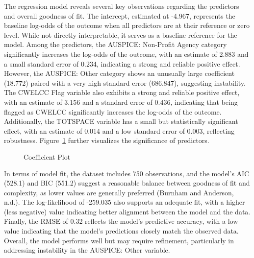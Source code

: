 \documentclass[
  letterpaper,
  DIV=11,
  numbers=noendperiod]{scrartcl}
\begin{document}
The regression model reveals several key observations regarding the
predictors and overall goodness of fit. The intercept, estimated at
-4.967, represents the baseline log-odds of the outcome when all
predictors are at their reference or zero level. While not directly
interpretable, it serves as a baseline reference for the model. Among
the predictors, the AUSPICE: Non-Profit Agency category significantly
increases the log-odds of the outcome, with an estimate of 2.883 and a
small standard error of 0.234, indicating a strong and reliable positive
effect. However, the AUSPICE: Other category shows an unusually large
coefficient (18.772) paired with a very high standard error (686.847),
suggesting instability. The CWELCC Flag variable also exhibits a strong
and reliable positive effect, with an estimate of 3.156 and a standard
error of 0.436, indicating that being flagged as CWELCC significantly
increases the log-odds of the outcome. Additionally, the TOTSPACE
variable has a small but statistically significant effect, with an
estimate of 0.014 and a low standard error of 0.003, reflecting
robustness. Figure~\ref{fig-cp} further visualizes the significance of
predictors.

\begin{figure}


\caption{\label{fig-cp}Coefficient Plot}

\end{figure}%

In terms of model fit, the dataset includes 750 observations, and the
model's AIC (528.1) and BIC (551.2) suggest a reasonable balance between
goodness of fit and complexity, as lower values are generally preferred
(Burnham and Anderson, n.d.). The log-likelihood of -259.035 also
supports an adequate fit, with a higher (less negative) value indicating
better alignment between the model and the data. Finally, the RMSE of
0.32 reflects the model's predictive accuracy, with a low value
indicating that the model's predictions closely match the observed data.
Overall, the model performs well but may require refinement,
particularly in addressing instability in the AUSPICE: Other variable.
\end{document}
